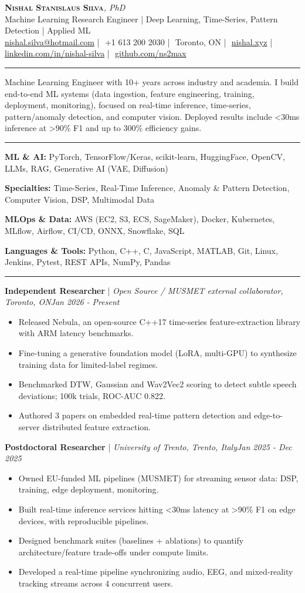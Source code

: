 \documentclass[10pt]{article}
\makeatletter
\newcommand{\contactline}{%
  \href{mailto:nishal.silva@hotmail.com}{nishal.silva@hotmail.com}\SEP
  +1 613 200 2030\SEP
  Toronto, ON\SEP
  \href{https://nishal.xyz}{nishal.xyz}\SEP
  \href{https://www.linkedin.com/in/nishal-silva}{linkedin.com/in/nishal-silva}\SEP
  \href{https://github.com/ns2max}{github.com/ns2max}}
\newcommand{\SEP}{\,\,|\,\,}
\newcommand{\makeheader}{%
  \begin{center}
    {\LARGE\scshape\textbf{Nishal Stanislaus Silva}}{\large\textit{, PhD}}\\[3pt]
    {\small \cvtagline}\\[2pt]
    {\small \contactline}
  \end{center}\vspace{-8pt}}
\newcommand{\cvsection}[1]{\par\vspace{8pt}\noindent{\large\scshape #1}\par\vspace{-5pt}\noindent\rule{\linewidth}{0.4pt}\par\vspace{2pt}}
\newcommand{\skillline}[2]{\textbf{#1:} #2\par}
\newenvironment{role}[4]{\par\noindent\textbf{#1} | \textit{\small #2, #3}\hfill\textit{\small #4}\par
  \begin{itemize}[leftmargin=1.3em,itemsep=0.6pt,parsep=0pt,topsep=1.5pt,partopsep=0pt]}
  {\end{itemize}\par\vspace{5pt}}
\newcommand{\cvtagline}{Machine Learning Research Engineer | Deep Learning, Time-Series, Pattern Detection | Applied ML}
\makeatother
\begin{document}
\makeheader

\cvsection{Summary}
Machine Learning Engineer with 10+ years across industry and academia. I build end-to-end ML systems (data ingestion, feature engineering, training, deployment, monitoring), focused on real-time inference, time-series, pattern/anomaly detection, and computer vision. Deployed results include <30ms inference at >90\% F1 and up to 300\% efficiency gains.

\cvsection{Skills}
\skillline{ML \& AI}{PyTorch, TensorFlow/Keras, scikit-learn, HuggingFace, OpenCV, LLMs, RAG, Generative AI (VAE, Diffusion)}
\skillline{Specialties}{Time-Series, Real-Time Inference, Anomaly \& Pattern Detection, Computer Vision, DSP, Multimodal Data}
\skillline{MLOps \& Data}{AWS (EC2, S3, ECS, SageMaker), Docker, Kubernetes, MLflow, Airflow, CI/CD, ONNX, Snowflake, SQL}
\skillline{Languages \& Tools}{Python, C++, C, JavaScript, MATLAB, Git, Linux, Jenkins, Pytest, REST APIs, NumPy, Pandas}

\cvsection{Experience}
\begin{role}{Independent Researcher}{Open Source / MUSMET external collaborator}{Toronto, ON}{Jan 2026 - Present}
  \item Released Nebula, an open-source C++17 time-series feature-extraction library with ARM latency benchmarks.
  \item Fine-tuning a generative foundation model (LoRA, multi-GPU) to synthesize training data for limited-label regimes.
  \item Benchmarked DTW, Gaussian and Wav2Vec2 scoring to detect subtle speech deviations; 100k trials, ROC-AUC 0.822.
  \item Authored 3 papers on embedded real-time pattern detection and edge-to-server distributed feature extraction.
\end{role}

\begin{role}{Postdoctoral Researcher}{University of Trento}{Trento, Italy}{Jan 2025 - Dec 2025}
  \item Owned EU-funded ML pipelines (MUSMET) for streaming sensor data: DSP, training, edge deployment, monitoring.
  \item Built real-time inference services hitting <30ms latency at >90\% F1 on edge devices, with reproducible pipelines.
  \item Designed benchmark suites (baselines + ablations) to quantify architecture/feature trade-offs under compute limits.
  \item Developed a real-time pipeline synchronizing audio, EEG, and mixed-reality tracking streams across 4 concurrent users.
\end{role}
\end{document}
